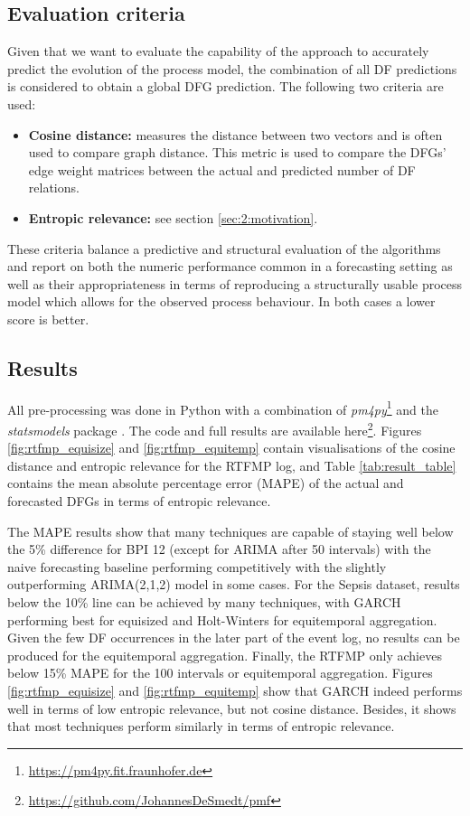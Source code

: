 \subsection{Evaluation criteria}
Given that we want to evaluate the capability of the approach to accurately predict the evolution of the process model, the combination of all DF predictions is considered to obtain a global DFG prediction.
The following two criteria are used:
\begin{itemize}
	\item \textbf{Cosine distance:} measures the distance between two vectors and is often used to compare graph distance. This metric is used to compare the DFGs' edge weight matrices between the actual and predicted number of DF relations.
	\item \textbf{Entropic relevance:} see section \ref{sec:2:motivation}.
\end{itemize}
These criteria balance a predictive and structural evaluation of the algorithms and report on both the numeric performance common in a forecasting setting as well as their appropriateness in terms of reproducing a structurally usable process model which allows for the observed process behaviour.
In both cases a lower score is better.

\subsection{Results}
All pre-processing was done in Python with a combination of \emph{pm4py}\footnote{\url{https://pm4py.fit.fraunhofer.de}} and the \emph{statsmodels} package \cite{seabold2010statsmodels}. 
The code and full results are available here\footnote{\url{https://github.com/JohannesDeSmedt/pmf}}.
Figures \ref{fig:rtfmp_equisize} and \ref{fig:rtfmp_equitemp} contain visualisations of the cosine distance and entropic relevance for the RTFMP log, and Table \ref{tab:result_table} contains the mean absolute percentage error (MAPE) of the actual and forecasted DFGs in terms of entropic relevance.


The MAPE results show that many techniques are capable of staying well below the 5\% difference for BPI 12 (except for ARIMA after 50 intervals) with the naive forecasting baseline performing competitively with the slightly outperforming ARIMA(2,1,2) model in some cases.
For the Sepsis dataset, results below the 10\% line can be achieved by many techniques, with GARCH performing best for equisized and Holt-Winters for equitemporal aggregation.
Given the few DF occurrences in the later part of the event log, no results can be produced for the equitemporal aggregation.
Finally, the RTFMP only achieves below 15\% MAPE for the 100 intervals or equitemporal aggregation.
Figures \ref{fig:rtfmp_equisize} and \ref{fig:rtfmp_equitemp} show that GARCH indeed performs well in terms of low entropic relevance, but not cosine distance.
Besides, it shows that most techniques perform similarly in terms of entropic relevance.

